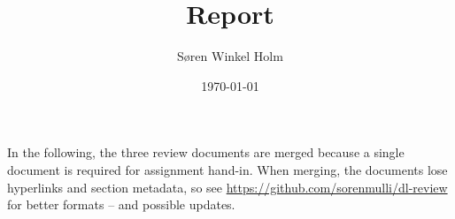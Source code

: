 \documentclass[12pt,fleqn]{article}
\title{Report}
\author{Søren Winkel Holm}
\date{\today}
\begin{document}
\thispagestyle{empty}
\noindent
In the following, the three review documents are merged because a single document is required for assignment hand-in.
When merging, the documents lose hyperlinks and section metadata, so see \url{https://github.com/sorenmulli/dl-review} for better formats -- and possible updates.




\end{document}
